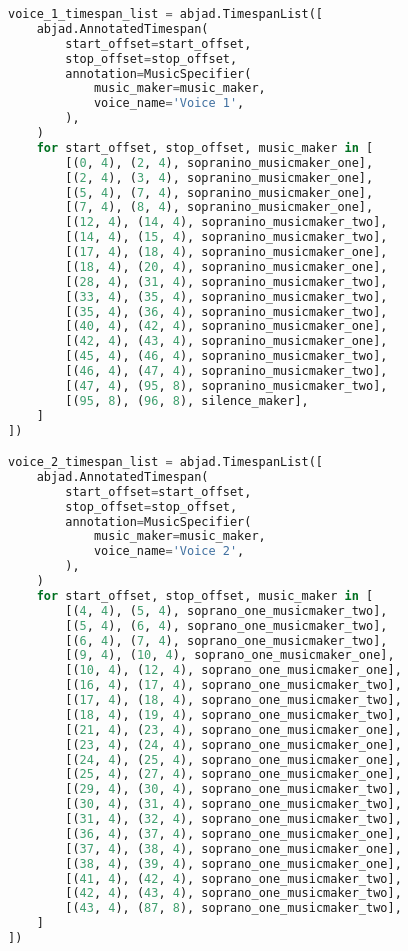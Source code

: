 \begin{lstlisting}[language=Python, caption=Invocation Source Code]
voice_1_timespan_list = abjad.TimespanList([
    abjad.AnnotatedTimespan(
        start_offset=start_offset,
        stop_offset=stop_offset,
        annotation=MusicSpecifier(
            music_maker=music_maker,
            voice_name='Voice 1',
        ),
    )
    for start_offset, stop_offset, music_maker in [
        [(0, 4), (2, 4), sopranino_musicmaker_one],
        [(2, 4), (3, 4), sopranino_musicmaker_one],
        [(5, 4), (7, 4), sopranino_musicmaker_one],
        [(7, 4), (8, 4), sopranino_musicmaker_one],
        [(12, 4), (14, 4), sopranino_musicmaker_two],
        [(14, 4), (15, 4), sopranino_musicmaker_two],
        [(17, 4), (18, 4), sopranino_musicmaker_one],
        [(18, 4), (20, 4), sopranino_musicmaker_one],
        [(28, 4), (31, 4), sopranino_musicmaker_two],
        [(33, 4), (35, 4), sopranino_musicmaker_two],
        [(35, 4), (36, 4), sopranino_musicmaker_two],
        [(40, 4), (42, 4), sopranino_musicmaker_one],
        [(42, 4), (43, 4), sopranino_musicmaker_one],
        [(45, 4), (46, 4), sopranino_musicmaker_two],
        [(46, 4), (47, 4), sopranino_musicmaker_two],
        [(47, 4), (95, 8), sopranino_musicmaker_two],
        [(95, 8), (96, 8), silence_maker],
    ]
])

voice_2_timespan_list = abjad.TimespanList([
    abjad.AnnotatedTimespan(
        start_offset=start_offset,
        stop_offset=stop_offset,
        annotation=MusicSpecifier(
            music_maker=music_maker,
            voice_name='Voice 2',
        ),
    )
    for start_offset, stop_offset, music_maker in [
        [(4, 4), (5, 4), soprano_one_musicmaker_two],
        [(5, 4), (6, 4), soprano_one_musicmaker_two],
        [(6, 4), (7, 4), soprano_one_musicmaker_two],
        [(9, 4), (10, 4), soprano_one_musicmaker_one],
        [(10, 4), (12, 4), soprano_one_musicmaker_one],
        [(16, 4), (17, 4), soprano_one_musicmaker_two],
        [(17, 4), (18, 4), soprano_one_musicmaker_two],
        [(18, 4), (19, 4), soprano_one_musicmaker_two],
        [(21, 4), (23, 4), soprano_one_musicmaker_one],
        [(23, 4), (24, 4), soprano_one_musicmaker_one],
        [(24, 4), (25, 4), soprano_one_musicmaker_one],
        [(25, 4), (27, 4), soprano_one_musicmaker_one],
        [(29, 4), (30, 4), soprano_one_musicmaker_two],
        [(30, 4), (31, 4), soprano_one_musicmaker_two],
        [(31, 4), (32, 4), soprano_one_musicmaker_two],
        [(36, 4), (37, 4), soprano_one_musicmaker_one],
        [(37, 4), (38, 4), soprano_one_musicmaker_one],
        [(38, 4), (39, 4), soprano_one_musicmaker_one],
        [(41, 4), (42, 4), soprano_one_musicmaker_two],
        [(42, 4), (43, 4), soprano_one_musicmaker_two],
        [(43, 4), (87, 8), soprano_one_musicmaker_two],
    ]
])


\end{lstlisting}
